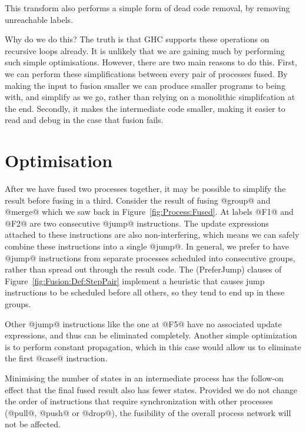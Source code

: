 This transform also performs a simple form of dead code removal, by removing unreachable labels.

Why do we do this?
The truth is that GHC supports these operations on recursive loops already.
It is unlikely that we are gaining much by performing such simple optimisations.
However, there are two main reasons to do this.
First, we can perform these simplifications between every pair of processes fused.
By making the input to fusion smaller we can produce smaller programs to being with, and simplify as we go, rather than relying on a monolithic simplifcation at the end.
Secondly, it makes the intermediate code smaller, making it easier to read and debug in the case that fusion fails.



\section{Optimisation}
\label{s:Optimisation}
After we have fused two processes together, it may be possible to simplify the result before fusing in a third. Consider the result of fusing @group@ and @merge@ which we saw back in Figure~\ref{fig:Process:Fused}. At labels @F1@ and @F2@ are two consecutive @jump@ instructions.
The update expressions attached to these instructions are also non-interfering, which means we can safely combine these instructions into a single @jump@.
In general, we prefer to have @jump@ instructions from separate processes scheduled into consecutive groups, rather than spread out through the result code.
The (PreferJump) clauses of Figure~\ref{fig:Fusion:Def:StepPair} implement a heuristic that causes jump instructions to be scheduled before all others, so they tend to end up in these groups.

Other @jump@ instructions like the one at @F5@ have no associated update expressions, and thus can be eliminated completely. Another simple optimization is to perform constant propagation, which in this case would allow us to eliminate the first @case@ instruction. 

Minimising the number of states in an intermediate process has the follow-on effect that the final fused result also has fewer states. Provided we do not change the order of instructions that require synchronization with other processes (@pull@, @push@ or @drop@), the fusibility of the overall process network will not be affected.

